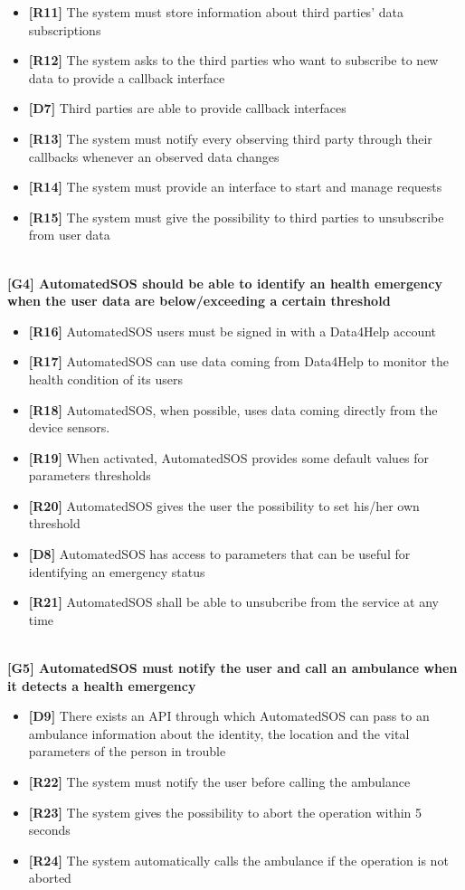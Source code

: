 \begin{itemize}
	\item \textbf{[R11]} The system must store information about third parties' data subscriptions
	\item \textbf{[R12]} The system asks to the third parties who want to subscribe to new data to provide a callback interface
	\item \textbf{[D7]} Third parties are able to provide callback interfaces
	\item \textbf{[R13]} The system must notify every observing third party through their callbacks whenever an observed data changes
	\item \textbf{[R14]} The system must provide an interface to start and manage requests
	\item \textbf{[R15]} The system must give the possibility to third parties to unsubscribe from user data
\end{itemize}
\\
\textbf{[G4] AutomatedSOS should be able to identify an health emergency when the user data are below/exceeding a certain threshold}
\begin{itemize}
	\item \textbf{[R16]} AutomatedSOS users must be signed in with a Data4Help account
	\item \textbf{[R17]} AutomatedSOS can use data coming from Data4Help to monitor the health condition of its users
	\item \textbf{[R18]} AutomatedSOS, when possible, uses data coming directly from the device sensors.
	\item \textbf{[R19]} When activated, AutomatedSOS provides some default values for parameters thresholds
	\item \textbf{[R20]} AutomatedSOS gives the user the possibility to set his/her own threshold 
	\item \textbf{[D8]} AutomatedSOS has access to parameters that can be useful for identifying an emergency status
	\item \textbf{[R21]} AutomatedSOS shall be able to unsubcribe from the service at any time
\end{itemize}
\\
\textbf{[G5] AutomatedSOS must notify the user and call an ambulance when it detects a health emergency}
\begin{itemize}
	\item \textbf{[D9]} There exists an API through which AutomatedSOS can pass to an ambulance information about the identity, the location and the vital parameters of the person in trouble
	\item \textbf{[R22]} The system must notify the user before calling the ambulance
	\item \textbf{[R23]} The system gives the possibility to abort the operation within 5 seconds
	\item \textbf{[R24]} The system automatically calls the ambulance if the operation is not aborted
\end{itemize}
